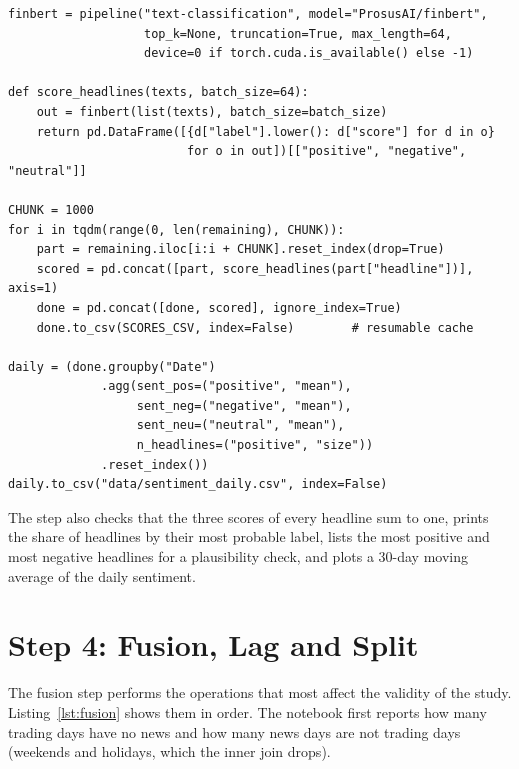 \begin{lstlisting}[float=!htbp, caption={FinBERT scoring and daily aggregation (Step 3).}, label={lst:finbert}]
finbert = pipeline("text-classification", model="ProsusAI/finbert",
                   top_k=None, truncation=True, max_length=64,
                   device=0 if torch.cuda.is_available() else -1)

def score_headlines(texts, batch_size=64):
    out = finbert(list(texts), batch_size=batch_size)
    return pd.DataFrame([{d["label"].lower(): d["score"] for d in o}
                         for o in out])[["positive", "negative", "neutral"]]

CHUNK = 1000
for i in tqdm(range(0, len(remaining), CHUNK)):
    part = remaining.iloc[i:i + CHUNK].reset_index(drop=True)
    scored = pd.concat([part, score_headlines(part["headline"])], axis=1)
    done = pd.concat([done, scored], ignore_index=True)
    done.to_csv(SCORES_CSV, index=False)        # resumable cache

daily = (done.groupby("Date")
             .agg(sent_pos=("positive", "mean"),
                  sent_neg=("negative", "mean"),
                  sent_neu=("neutral", "mean"),
                  n_headlines=("positive", "size"))
             .reset_index())
daily.to_csv("data/sentiment_daily.csv", index=False)
\end{lstlisting}

The step also checks that the three scores of every headline sum to one, prints the share of headlines by their most probable label, lists the most positive and most negative headlines for a plausibility check, and plots a 30-day moving average of the daily sentiment.

\section{Step 4: Fusion, Lag and Split}
The fusion step performs the operations that most affect the validity of the study. Listing~\ref{lst:fusion} shows them in order. The notebook first reports how many trading days have no news and how many news days are not trading days (weekends and holidays, which the inner join drops).

